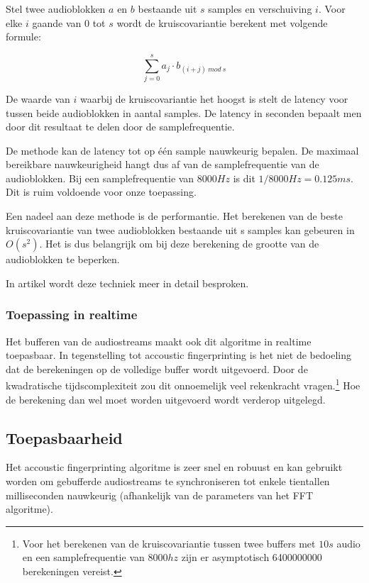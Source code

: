 Stel twee audioblokken $ a $ en $ b $ bestaande uit $ s $ samples en verschuiving $ i $. Voor elke $ i $ gaande van 0 tot $ s $ wordt de kruiscovariantie berekent met volgende formule:

\begin{equation}
\sum_{j=0}^{s} a_{j} \cdot b_{(i+j)\ mod\ s}
\end{equation}

De waarde van $ i $ waarbij de kruiscovariantie het hoogst is stelt de latency voor tussen beide audioblokken in aantal samples. De latency in seconden bepaalt men door dit resultaat te delen door de samplefrequentie.

De methode kan de latency tot op één sample nauwkeurig bepalen. De maximaal bereikbare nauwkeurigheid hangt dus af van de samplefrequentie van de audioblokken. Bij een samplefrequentie van $8000 Hz$ is dit $ 1/8000 Hz = 0.125 ms $. Dit is ruim voldoende voor onze toepassing.

Een nadeel aan deze methode is de performantie. Het berekenen van de beste kruiscovariantie van twee audioblokken bestaande uit s samples kan gebeuren in  $O(s^{2})$. Het is dus belangrijk om bij deze berekening de grootte van de audioblokken te beperken.

In artikel \citealp{six2015multimodal} wordt deze techniek meer in detail besproken.

\subsubsection{Toepassing in realtime}

Het bufferen van de audiostreams maakt ook dit algoritme in realtime toepasbaar. In tegenstelling tot accoustic fingerprinting is het niet de bedoeling dat de berekeningen op de volledige buffer wordt uitgevoerd. Door de kwadratische tijdscomplexiteit zou dit onnoemelijk veel rekenkracht vragen.\footnote{Voor het berekenen van de kruiscovariantie tussen twee buffers met $10s$ audio en een samplefrequentie van $8000hz$ zijn er asymptotisch 6400000000 berekeningen vereist.} Hoe de berekening dan wel moet worden uitgevoerd wordt verderop uitgelegd.

\subsection{Toepasbaarheid}

Het accoustic fingerprinting algoritme is zeer snel en robuust en kan gebruikt worden om gebufferde audiostreams te synchroniseren tot enkele tientallen milliseconden nauwkeurig (afhankelijk van de parameters van het FFT algoritme).

